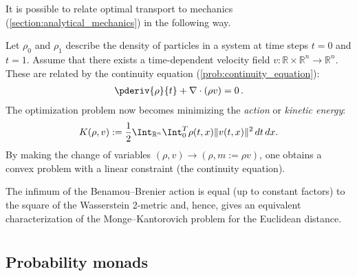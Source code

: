     It is possible to relate optimal transport to mechanics (\cref{section:analytical_mechanics}) in the following way.
    \begin{method}
        Let $\rho_0$ and $\rho_1$ describe the density of particles in a system at time steps $t=0$ and $t=1$. Assume that there exists a time-dependent velocity field $v:\mathbb{R}\times\mathbb{R}^n\rightarrow\mathbb{R}^n$. These are related by the continuity equation (\cref{prob:continuity_equation}):
        \begin{gather}
            \pderiv{\rho}{t} + \nabla\cdot(\rho v) = 0\,.
        \end{gather}
        The optimization problem now becomes minimizing the \textit{action} or \textit{kinetic energy}:
        \begin{gather}
            K(\rho,v) := \frac{1}{2}\Int_{\mathbb{R}^n}\Int_0^T\rho(t,x)\|v(t,x)\|^2\,dt\,dx.
        \end{gather}
        By making the change of variables $(\rho,v)\longrightarrow(\rho,m:=\rho v)$, one obtains a convex problem with a linear constraint (the continuity equation).
    \end{method}
    \begin{property}
        The infimum of the Benamou--Brenier action is equal (up to constant factors) to the square of the Wasserstein 2-metric and, hence, gives an equivalent characterization of the Monge--Kantorovich problem for the Euclidean distance.
    \end{property}

\section{}
\subsection{Probability monads}

